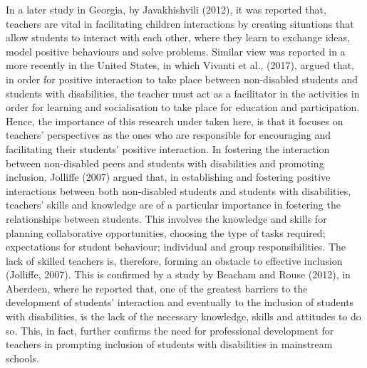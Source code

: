 \documentclass[11.5pt]{sig-alternate}
\begin{document}
\begin{large}
In a later study in Georgia, by Javakhishvili (2012), it was reported that, teachers are vital in facilitating children interactions by creating situations that allow students to interact with each other, where they learn to exchange ideas, model positive behaviours and solve problems. Similar view was reported in a more recently in the United States, in which Vivanti et al., (2017), argued that, in order for positive interaction to take place between non-disabled students and students with disabilities, the teacher must act as a facilitator in the activities in order for learning and socialisation to take place for education and participation. Hence, the importance of this research under taken here, is that it focuses on teachers’ perspectives as the ones who are responsible for encouraging and facilitating their students' positive interaction. In fostering the interaction between non-disabled peers and students with disabilities and promoting inclusion, Jolliffe (2007) argued that, in establishing and fostering positive interactions between both non-disabled students and students with disabilities, teachers’ skills and knowledge are of a particular importance in fostering the relationships between students. This involves the knowledge and skills for planning collaborative opportunities, choosing the type of tasks required; expectations for student behaviour; individual and group responsibilities. The lack of skilled teachers is, therefore, forming an obstacle to effective inclusion (Jolliffe, 2007). This is confirmed by a study by Beacham and Rouse (2012), in Aberdeen, where he reported that, one of the greatest barriers to the development of students’ interaction and eventually to the inclusion of students with disabilities, is the lack of the necessary knowledge, skills and attitudes to do so. This, in fact, further confirms the need for professional development for teachers in prompting inclusion of students with disabilities in mainstream schools. 


\end{large}
\end{document}
